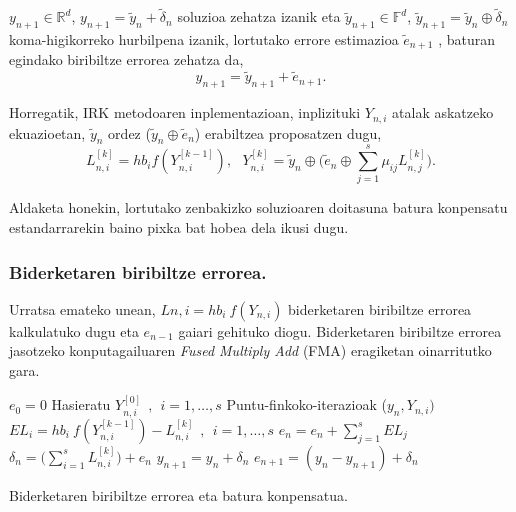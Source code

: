 $y_{n+1} \in \mathbb{R}^{d}$,  $y_{n+1}=\tilde y_{n}+\tilde \delta_n$ soluzioa zehatza izanik eta $\tilde y_{n+1} \in \mathbb{F}^{d}$,  $\tilde y_{n+1}=\tilde y_{n} \oplus \tilde \delta_n$ koma-higikorreko hurbilpena izanik, lortutako errore estimazioa $\tilde{e}_{n+1}$ ,  baturan egindako  biribiltze errorea zehatza da,
\begin{equation}
y_{n+1}=\tilde {y}_{n+1}+\tilde {e}_{n+1}. 
\end{equation}

Horregatik, IRK metodoaren inplementazioan, inplizituki $Y_{n,i}$ atalak askatzeko ekuazioetan, $\tilde {y}_n$ ordez ($\tilde{y}_n \oplus \tilde{e}_{n}$) erabiltzea proposatzen dugu, 
\begin{equation}
\label{eq:eqbk}
L_{n,i}^{[k]}=hb_if(Y_{n,i}^{[k-1]}), \ \ \ Y_{n,i}^{[k]}=\tilde{y}_n \oplus \big(\tilde{e}_{n} \oplus \sum\limits_{j=1}^{s} \mu_{ij} L_{n,j}^{[k]}\big).
\end{equation}

Aldaketa honekin, lortutako zenbakizko soluzioaren doitasuna batura konpensatu estandarrarekin baino pixka bat hobea dela ikusi dugu. 

\subsubsection*{Biderketaren biribiltze errorea.}

Urratsa emateko unean, $L{n,i}=hb_i \ f(Y_{n,i})$ biderketaren biribiltze errorea kalkulatuko dugu eta $e_{n-1}$ gaiari gehituko diogu. Biderketaren biribiltze errorea jasotzeko konputagailuaren \emph{Fused Multiply Add} (FMA) eragiketan oinarritutko gara. 


\begin{algorithm}[h]
 \BlankLine
  ${e}_{0}=0$\;
  \BlankLine
  {
   Hasieratu  $Y_{n,i}^{[0]} \ \ , \ \ i=1,\dots,s $\;
   Puntu-finkoko-iterazioak ($y_n, Y_{n,i})$ \;
   \BlankLine
    $EL_{i}=hb_i \ f(Y^{[k-1]}_{n,i}) - L^{[k]}_{n,i} \ \ , \ \ i=1,\dots,s$\;
    ${e}_{n}={e}_{n} + \sum\limits_{j=1}^{s}EL_{j}$\;
    ${\delta}_{n}= \big(\sum\limits_{i=1}^{s} L_{n,i}^{[k]}\big) + {e}_{n} $\;
    ${y}_{n+1}={y}_{n} + {\delta}_n$\;
    ${e}_{n+1}=({y}_{n} - {y}_{n+1})+ {\delta}_n$\;            
   \BlankLine
 }
 \caption{Biderketaren biribiltze errorea eta batura konpensatua.}
\end{algorithm}

